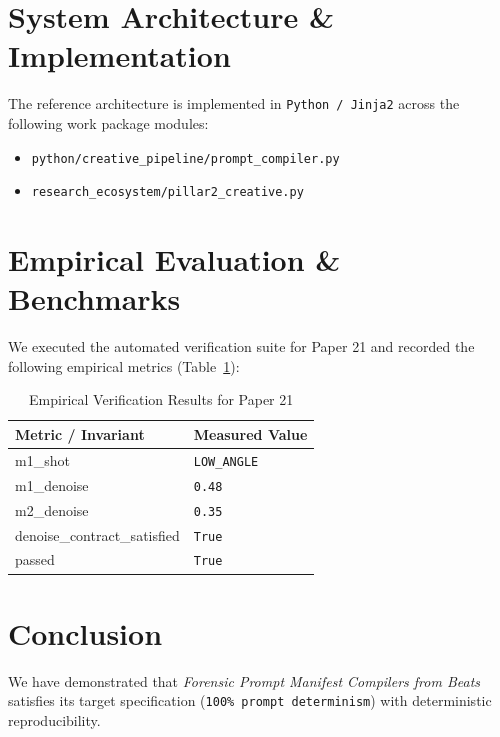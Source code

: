 \documentclass[10pt,twocolumn]{article}
\begin{document}
\section{System Architecture \& Implementation}
The reference architecture is implemented in \texttt{Python / Jinja2} across the following work package modules:
\begin{itemize}
  \item \texttt{python/creative\_pipeline/prompt\_compiler.py}
  \item \texttt{research\_ecosystem/pillar2\_creative.py}
\end{itemize}

\section{Empirical Evaluation \& Benchmarks}
We executed the automated verification suite for Paper 21 and recorded the following empirical metrics (Table~\ref{tab:metrics}):

\begin{table}[htbp]
\centering
\caption{Empirical Verification Results for Paper 21}
\label{tab:metrics}
\begin{tabular}{ll}
\toprule
\textbf{Metric / Invariant} & \textbf{Measured Value} \\
\midrule
    m1\_shot & \texttt{LOW\_ANGLE} \\
    m1\_denoise & \texttt{0.48} \\
    m2\_denoise & \texttt{0.35} \\
    denoise\_contract\_satisfied & \texttt{True} \\
    passed & \texttt{True} \\
\bottomrule
\end{tabular}
\end{table}

\section{Conclusion}
We have demonstrated that \textit{Forensic Prompt Manifest Compilers from Beats} satisfies its target specification (\texttt{100\% prompt determinism}) with deterministic reproducibility.



\end{document}
